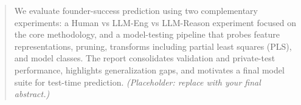 \documentclass{article}
\theoremstyle{plain}
\theoremstyle{definition}
\theoremstyle{remark}
\begin{document}



\printAffiliationsAndNotice{}  %

\begin{abstract}
We evaluate founder-success prediction using two complementary experiments: a Human vs LLM-Eng vs LLM-Reason experiment focused on the core methodology, and a model-testing pipeline that probes feature representations, pruning, transforms including partial least squares (PLS), and model classes. The report consolidates validation and private-test performance, highlights generalization gaps, and motivates a final model suite for test-time prediction. \textit{(Placeholder: replace with your final abstract.)}
\end{abstract}
\end{document}
